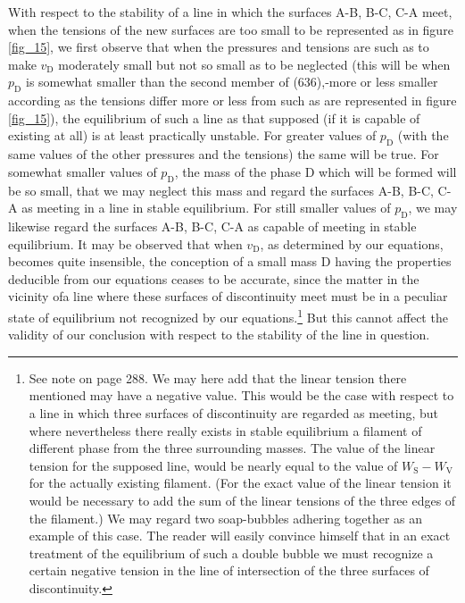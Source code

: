 \documentclass[12pt]{memoir}
\begin{document}
With respect to the stability of a line in which the surfaces A-B, B-C, C-A meet, when the tensions of the new surfaces are too small to be represented as in figure \ref{fig_15}, we first observe that when the pressures and tensions are such as to make $v_\text{D}$ moderately small but not so small as to be neglected (this will be when $p_\text{D}$ is somewhat smaller than the second member of (636),-more or less smaller according as the tensions differ more or less from such as are represented in figure \ref{fig_15}), the equilibrium of such a line as that supposed (if it is capable of existing at all) is at least practically unstable. For greater values of $p_\text{D}$ (with the same values of the other pressures and the tensions) the same will be true.  For somewhat smaller values of $p_\text{D}$, the mass of the phase D which will be formed will be so small, that we may neglect this mass and regard the surfaces A-B, B-C, C-A as meeting in a line in stable equilibrium. For still smaller values of $p_\text{D}$, we may likewise regard the surfaces A-B, B-C, C-A as capable of meeting in stable equilibrium. It may be observed that when $v_\text{D}$, as determined by our equations, becomes quite insensible, the conception of a small mass D having the properties deducible from our equations ceases to be accurate, since the matter in the vicinity ofa line where these surfaces of discontinuity meet must be in a peculiar state of equilibrium not recognized by our equations.\footnote{See note on page 288. We may here add that the linear tension there mentioned may have a negative value. This would be the case with respect to a line in which three surfaces of discontinuity are regarded as meeting, but where nevertheless there really exists in stable equilibrium a filament of different phase from the three surrounding masses. The value of the linear tension for the supposed line, would be nearly equal to the value of $W_\text{S}-W_\text{V}$ for the actually existing filament. (For the exact value of the linear tension it would be necessary to add the sum of the linear tensions of the three edges of the filament.) We may regard two soap-bubbles adhering together as an example of this case. The reader will easily convince himself that in an exact treatment of the equilibrium of such a double bubble we must recognize a certain negative tension in the line of intersection of the three surfaces of discontinuity.} But this cannot affect the validity of our conclusion with respect to the stability of the line in question.
\end{document}
